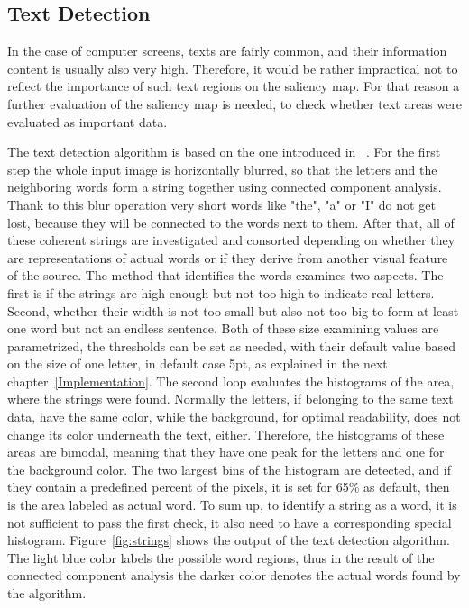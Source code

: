 \documentclass[draft,final]{vutinfth} %
\begin{document}
	\subsection{Text Detection}
	In the case of computer screens, texts are fairly common, and their information content is usually also very high.
	Therefore, it would be rather impractical not to reflect the importance of such text regions on the saliency map. 
	For that reason a further evaluation of the saliency map is needed, to check whether text areas were evaluated as important data.\par 
	The text detection algorithm is based on the one introduced in ~\cite{chang2011associating}.
	For the first step the whole input image is horizontally blurred, so that the letters and the neighboring words form a string together using connected component analysis.
	Thank to this blur operation very short words like "the", "a" or "I" do not get lost, because they will be connected to the words next to them.
	After that, all of these coherent strings are investigated and consorted depending on whether they are representations of actual words or if they derive from another visual feature of the source.
	The method that identifies the words examines two aspects.
	The first is if the strings are high enough but not too high to indicate real letters.
	Second, whether their width is not too small but also not too big to form at least one word but not an endless sentence.
	Both of these size examining values are parametrized, the thresholds can be set as needed, with their default value based on the size of one letter, in default case 5pt, as explained in the next chapter~\ref{Implementation}. 
	The second loop evaluates the histograms of the area, where the strings were found.
	Normally the letters, if belonging to the same text data, have the same color, while the background, for optimal readability, does not change its color underneath the text, either.
	Therefore, the histograms of these areas are bimodal, meaning that they have one peak for the letters and one for the background color. 
	The two largest bins of the histogram are detected, and if they contain a predefined percent of the pixels, it is set for 65\% as default, then is the area labeled as actual word.
	To sum up, to identify a string as a word, it is not sufficient to pass the first check, it  also need  to have a corresponding special histogram. 
	Figure~\ref{fig:strings} shows the output of the text detection algorithm. 
	The light blue color labels the possible word regions, thus in the result of the connected component analysis the darker color denotes the actual words found by the algorithm.\par 
\end{document}
